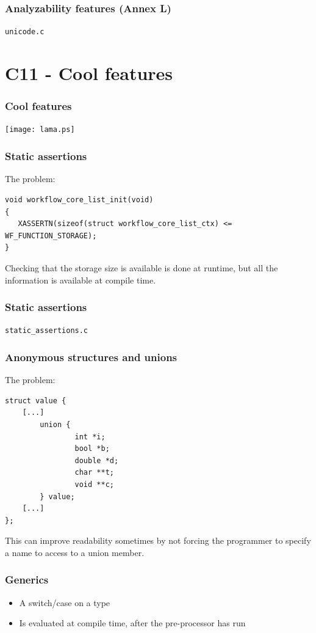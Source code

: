 \documentclass{beamer}
\begin{document}
\begin{frame}
	\frametitle{Analyzability features (Annex L)}
	\texttt{unicode.c}
\end{frame}

\section{C11 - Cool features}

\begin{frame}
	\frametitle{Cool features}
	\begin{center}
		\texttt{[image: lama.ps]}
	\end{center}
\end{frame}


\begin{frame}[fragile]
	\frametitle{Static assertions}
	\par The problem:
	\begin{lstlisting}
void workflow_core_list_init(void)
{
   XASSERTN(sizeof(struct workflow_core_list_ctx) <= WF_FUNCTION_STORAGE);
}
	\end{lstlisting}
	\pause
	\par Checking that the storage size is available is done at
	runtime, but all the information is available at compile time.
\end{frame}

\begin{frame}
	\frametitle{Static assertions}
	\texttt{static\_assertions.c}
\end{frame}

\begin{frame}[fragile]
	\frametitle{Anonymous structures and unions}
	\par The problem:
	\begin{lstlisting}
struct value {
	[...]
        union {
                int *i; 
                bool *b; 
                double *d; 
                char **t;
                void **c;
        } value;
	[...]
};
	\end{lstlisting}
	\par This can improve readability sometimes by not forcing the
	     programmer to specify a name to access to a union member.
\end{frame}

\begin{frame}[fragile]
	\frametitle{Generics}
	\begin{itemize}
	\item A switch/case on a type
	\item Is evaluated at compile time, after the pre-processor has run
	\end{itemize}
\end{frame}
\end{document}
